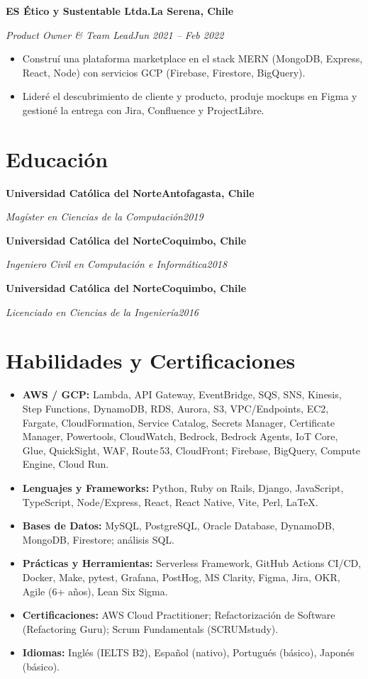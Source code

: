 \documentclass[11pt,a4paper]{article}
\newcommand{\entry}[4]{%
  \textbf{#1}\hfill\textbf{#2}\par
  \textit{#3}\hfill\textit{#4}\par\vspace{2pt}%
}
\begin{document}
\entry{ES Ético y Sustentable Ltda.}{La Serena, Chile}{Product Owner \& Team Lead}{Jun 2021 -- Feb 2022}
\begin{itemize}
  \item Construí una plataforma marketplace en el stack MERN (MongoDB, Express, React, Node)
        con servicios GCP (Firebase, Firestore, BigQuery).
  \item Lideré el descubrimiento de cliente y producto, produje mockups en Figma y gestioné
        la entrega con Jira, Confluence y ProjectLibre.
\end{itemize}

\section{Educación}
\entry{Universidad Católica del Norte}{Antofagasta, Chile}{Magíster en Ciencias de la Computación}{2019}
\vspace{3pt}
\entry{Universidad Católica del Norte}{Coquimbo, Chile}{Ingeniero Civil en Computación e Informática}{2018}
\vspace{3pt}
\entry{Universidad Católica del Norte}{Coquimbo, Chile}{Licenciado en Ciencias de la Ingeniería}{2016}

\section{Habilidades y Certificaciones}
\begin{itemize}
  \item \textbf{AWS / GCP:} Lambda, API Gateway, EventBridge, SQS, SNS, Kinesis, Step Functions,
        DynamoDB, RDS, Aurora, S3, VPC/Endpoints, EC2, Fargate, CloudFormation, Service Catalog,
        Secrets Manager, Certificate Manager, Powertools, CloudWatch, Bedrock, Bedrock Agents,
        IoT Core, Glue, QuickSight, WAF, Route\,53, CloudFront; Firebase, BigQuery,
        Compute Engine, Cloud Run.
  \item \textbf{Lenguajes y Frameworks:} Python, Ruby on Rails, Django, JavaScript, TypeScript,
        Node/Express, React, React Native, Vite, Perl, \LaTeX.
  \item \textbf{Bases de Datos:} MySQL, PostgreSQL, Oracle Database, DynamoDB, MongoDB, Firestore; análisis SQL.
  \item \textbf{Prácticas y Herramientas:} Serverless Framework, GitHub Actions CI/CD, Docker, Make, pytest,
        Grafana, PostHog, MS Clarity, Figma, Jira, OKR, Agile (6+ años), Lean Six Sigma.
  \item \textbf{Certificaciones:} AWS Cloud Practitioner; Refactorización de Software
        (Refactoring Guru); Scrum Fundamentals (SCRUMstudy).
  \item \textbf{Idiomas:} Inglés (IELTS B2), Español (nativo), Portugués (básico), Japonés (básico).
\end{itemize}
\end{document}
